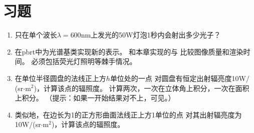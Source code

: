 \section{习题}\label{sec:习题05}
\begin{enumerate}
      \item \circleone 只在单个波长$\lambda=600\text{nm}$上发光的50W灯泡1秒内会射出多少光子？
      \item \circletwo 在pbrt中为光谱基类实现新的表示。
            和本章实现的与
            比较图像质量和渲染时间。
            必须包括荧光灯照明等棘手情况。
      \item \circleone 在单位半径圆盘的法线正上方$h$单位处的一点
            对圆盘有恒定出射辐亮度10W$/$(sr$\cdot$m$^2$)，计算该点的辐照度。
            计算两次，一次在立体角上积分，一次在面积上积分。
            （提示：如果一开始结果对不上，可见。）
      \item \circleone 类似地，在边长为1的正方形曲面法线正上方1单位的点
            对其出射辐亮度为10W$/$(sr$\cdot$m$^2$)，计算该点的辐照度。
\end{enumerate}